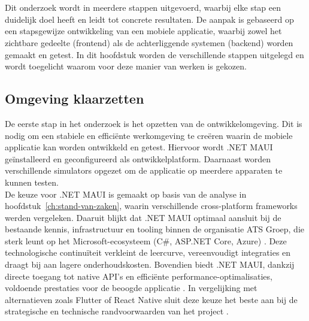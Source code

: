 
\chapter{}%
\label{ch:methodologie}

Dit onderzoek wordt in meerdere stappen uitgevoerd, waarbij elke stap een duidelijk doel heeft en leidt tot concrete resultaten. De aanpak is gebaseerd op een stapsgewijze ontwikkeling van een mobiele applicatie, waarbij zowel het zichtbare gedeelte (frontend) als de achterliggende systemen (backend) worden gemaakt en getest. In dit hoofdstuk worden de verschillende stappen uitgelegd en wordt toegelicht waarom voor deze manier van werken is gekozen.

\section{Omgeving klaarzetten}

De eerste stap in het onderzoek is het opzetten van de ontwikkelomgeving. Dit is nodig om een stabiele en efficiënte werkomgeving te creëren waarin de mobiele applicatie kan worden ontwikkeld en getest. Hiervoor wordt .NET MAUI geïnstalleerd en geconfigureerd als ontwikkelplatform. Daarnaast worden verschillende simulators opgezet om de applicatie op meerdere apparaten te kunnen testen.\\

De keuze voor .NET MAUI is gemaakt op basis van de analyse in hoofdstuk~\ref{ch:stand-van-zaken}, waarin verschillende cross-platform frameworks werden vergeleken. Daaruit blijkt dat .NET MAUI optimaal aansluit bij de bestaande kennis, infrastructuur en tooling binnen de organisatie ATS Groep, die sterk leunt op het Microsoft-ecosysteem (C#, ASP.NET Core, Azure) \autocite{Sheth2024, Klesman2023, Longe2025}. Deze technologische continuïteit verkleint de leercurve, vereenvoudigt integraties en draagt bij aan lagere onderhoudskosten. Bovendien biedt .NET MAUI, dankzij directe toegang tot native API’s en efficiënte performance-optimalisaties, voldoende prestaties voor de beoogde applicatie \autocite{Sheth2024}. In vergelijking met alternatieven zoals Flutter of React Native sluit deze keuze het beste aan bij de strategische en technische randvoorwaarden van het project \autocite{Gajjam2025, Longe2025}.\\

